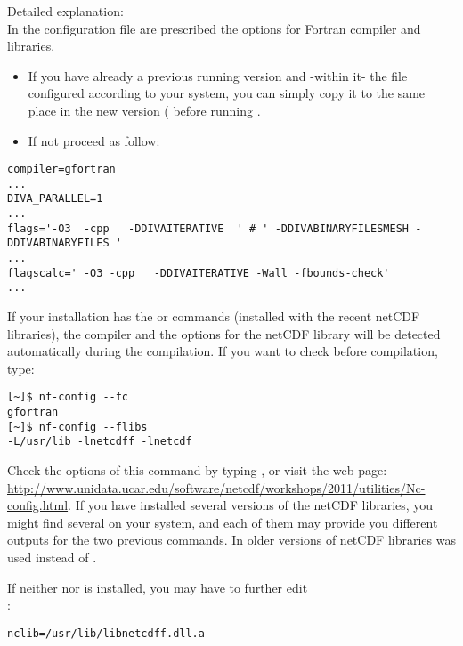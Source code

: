 Detailed explanation:\\
In the configuration file  are prescribed the options for Fortran compiler and libraries.
\begin{itemize}
\item If you have already a previous running \diva version and -within it- the file \\  configured according to your system, you can simply copy it to the same place in the new version ( before running  .
\item If not proceed as follow:
\end{itemize}

\begin{verbatim}
compiler=gfortran
...
DIVA_PARALLEL=1
...
flags='-O3  -cpp   -DDIVAITERATIVE  ' # ' -DDIVABINARYFILESMESH -DDIVABINARYFILES '
...
flagscalc=' -O3 -cpp   -DDIVAITERATIVE -Wall -fbounds-check'
...
\end{verbatim}

If your installation has the  or  commands (installed with the recent netCDF libraries), the compiler and the options for the netCDF  library will be detected automatically during the compilation. If you want to check before compilation, type:
\begin{lstlisting}[style=Bash]
[~]$ nf-config --fc
gfortran
[~]$ nf-config --flibs
-L/usr/lib -lnetcdff -lnetcdf
\end{lstlisting}
Check the options of this command by typing , or visit the web page: \url{http://www.unidata.ucar.edu/software/netcdf/workshops/2011/utilities/Nc-config.html}. If you have installed several versions of the netCDF libraries, you might find several  on your system, and each of them may provide you different outputs for the two previous commands. In older versions of netCDF libraries  was used instead of .

If neither  nor  is installed, you may have to further edit\\ 
:
\begin{verbatim}
nclib=/usr/lib/libnetcdff.dll.a
\end{verbatim}

